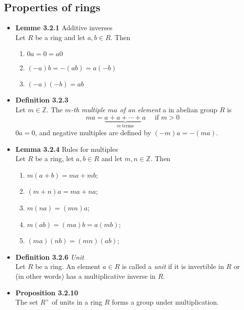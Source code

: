 \documentclass[11pt,a4paper]{article}
\begin{document}
\subsection{Properties of rings}

\begin{itemize}

    \item \textbf{Lemme 3.2.1} Additive inverses \\
        Let $R$ be a ring and let $a, b \in R$.
        Then
        \begin{enumerate}
            \item $0a = 0 = a0$
            \item $(-a)b = -(ab) = a(-b)$
            \item $(-a)(-b) = ab$
        \end{enumerate}

    \item \textbf{Definition 3.2.3} \\
        Let $m \in \mathbb{Z}$.
        The \emph{$m$-th multiple $ma$ of an element} a in abelian group $R$ is
        \[
            ma = \underbrace{a + a + \cdots + a}_{m \ \text{terms}} \quad \text{ if } m > 0
        \]
        $0a = 0$, and negative multiples are defined by $(-m)a = -(ma)$.

    \item \textbf{Lemma 3.2.4} Rules for multiples \\
        Let $R$ be a ring, let $a,b \in R$ and let $m,n \in \mathbb{Z}$.
        Then
        \begin{enumerate}
            \item $m(a+b)   = ma + mb$;
            \item $(m+n)a   = ma + na$;
            \item $m(na)    = (mn)a$;
            \item $m(ab)    = (ma)b      = a(mb)$;
            \item $(ma)(nb) = (mn)(ab)$;
        \end{enumerate}

    \item \textbf{Definition 3.2.6} \emph{Unit} \\
        Let $R$ be a ring.
        An element $a \in R$ is called a \emph{unit} if it is invertible in $R$ or (in other words)
        has a multiplicative inverse in $R$.

    \item \textbf{Proposition 3.2.10} \\
        The set $R^\times$ of units in a ring $R$ forms a group under multiplication.


\end{itemize}
\end{document}
